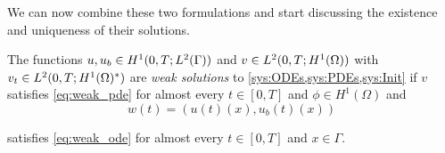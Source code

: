 We can now combine these two formulations and start discussing the existence and uniqueness of their solutions.

\begin{definition}{}{}
    The functions $u, u_b \in H^1(0, T; L^2(\Gamma))$ and $v \in L^2(0, T; H^1(\Omega))$ with $v_t \in L^2(0, T; H^1(\Omega)^*)$ are \emph{weak solutions} to \cref{sys:ODEs,sys:PDEs,sys:Init} if $v$ satisfies \cref{eq:weak_pde} for almost every $t \in [0, T]$ and $\phi \in H^1(\Omega)$ and 
    \begin{equation*}
        w(t) = (u(t)(x), u_b(t)(x))
    \end{equation*}
    
    satisfies \cref{eq:weak_ode} for almost every $t \in [0, T]$ and $x \in \Gamma$.
\end{definition}